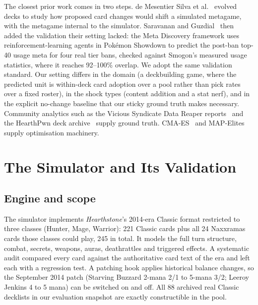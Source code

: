 \documentclass[conference]{IEEEtran}
\begin{document}
The closest prior work comes in two steps. de Mesentier Silva et
al.~\cite{demesentier2019meta} evolved decks to study how proposed
card changes would shift a simulated metagame, with the metagame
internal to the simulator. Saravanan and
Guzdial~\cite{saravanan2024meta} then added the validation their
setting lacked: the Meta Discovery framework uses
reinforcement-learning agents in Pok\'emon Showdown to predict the
post-ban top-40 usage meta for four real tier bans, checked against
Smogon's measured usage statistics, where it reaches 92--100\%
overlap. We adopt the same validation standard. Our setting differs
in the domain (a deckbuilding game, where the predicted unit is
within-deck card adoption over a pool rather than pick rates over a
fixed roster), in the shock types (content addition and a stat
nerf), and in the explicit no-change baseline that our sticky ground
truth makes necessary. Community analytics such as the Vicious
Syndicate Data Reaper reports~\cite{vicious_syndicate} and the
HearthPwn deck archive~\cite{zenodo_dataset} supply ground truth.
CMA-ES~\cite{hansen2001cmaes} and
MAP-Elites~\cite{mouret2015mapelites} supply optimisation machinery.

\section{The Simulator and Its Validation}
\label{sec:simulator}

\subsection{Engine and scope}
The simulator implements \emph{Hearthstone}'s 2014-era Classic
format restricted to three classes (Hunter, Mage, Warrior): 221
Classic cards plus all 24 Naxxramas cards those classes could play,
245 in total. It models the full turn structure, combat, secrets,
weapons, auras, deathrattles and triggered effects. A systematic
audit compared every card against the authoritative card text of the
era and left each with a regression test. A patching hook applies
historical balance changes, so the September 2014 patch (Starving
Buzzard 2-mana 2/1 to 5-mana 3/2; Leeroy Jenkins 4 to 5 mana) can be
switched on and off. All 88 archived real Classic decklists in our
evaluation snapshot are exactly constructible in the pool.
\end{document}

